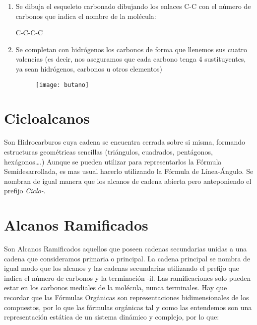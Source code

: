\begin{enumerate}
	\item Se dibuja el esqueleto carbonado dibujando los enlaces C-C con el número de carbonos que indica el nombre de la molécula:
	\begin{center}
		C-C-C-C
	\end{center}
	\item Se completan con hidrógenos los carbonos de forma que llenemos sus cuatro valencias (es decir, nos aseguramos que cada carbono tenga 4 sustituyentes, ya sean hidrógenos, carbonos u otros elementos)
	\begin{figure}[h!]
		\centering
		\texttt{[image: butano]}
	\end{figure}
\end{enumerate}
\section{Cicloalcanos}
Son Hidrocarburos cuya cadena se encuentra cerrada sobre si misma, formando estructuras geométricas sencillas (triángulos, cuadrados, pentágonos, hexágonos….)
Aunque se pueden utilizar para representarlos la Fórmula Semidesarrollada, es mas usual hacerlo utilizando la Fórmula de Línea-Ángulo. Se nombran de igual manera que los alcanos de cadena abierta pero anteponiendo el prefijo \emph{Ciclo-}.
\begin{figure}[h!]
	\centering
	\hspace{2cm}
	\hspace{2cm}
\end{figure}

\section{Alcanos Ramificados}
Son Alcanos Ramificados aquellos que poseen cadenas secundarias unidas a una cadena que consideramos primaria o principal. La cadena principal se nombra de igual modo que los alcanos y las cadenas secundarias utilizando el prefijo que indica el número de carbonos y la terminación -il. Las ramificaciones solo pueden estar en los carbonos mediales de la molécula, nunca terminales. Hay que recordar que las Fórmulas Orgánicas son representaciones bidimensionales de los compuestos, por lo que las fórmulas orgánicas tal y como las entendemos son una representación estática de un sistema dinámico y complejo, por lo que:

